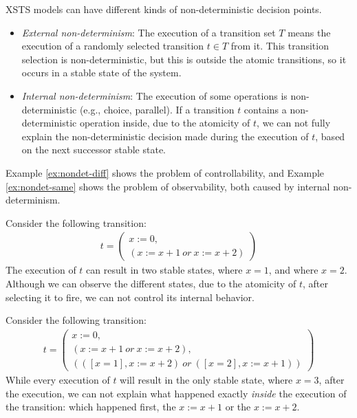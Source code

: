 XSTS models can have different kinds of non-deterministic decision points.

\begin{itemize}
    \item \textit{External non-determinism}: The execution of a transition set $T$ means the execution of a randomly selected transition $t \in T$ from it. This transition selection is non-deterministic, but this is outside the atomic transitions, so it occurs in a stable state of the system.
    \item \textit{Internal non-determinism}: The execution of some operations is non-deterministic (e.g., choice, parallel). If a transition $t$ contains a non-deterministic operation inside, due to the atomicity of $t$, we can not fully explain the non-deterministic decision made during the execution of $t$, based on the next successor stable state.
\end{itemize}

Example \ref{ex:nondet-diff} shows the problem of controllability, and Example \ref{ex:nondet-same} shows the problem of observability, both caused by internal non-determinism.

\begin{example}\label{ex:nondet-diff}
    Consider the following transition:
    \begin{align*}
    t = \begin{pmatrix}
    x := 0, \\
    (x := x + 1\ or\ x := x + 2)
    \end{pmatrix}
    \end{align*}
    The execution of $t$ can result in two stable states, where $x = 1$, and where $x = 2$. Although we can observe the different states, due to the atomicity of $t$, after selecting it to fire, we can not control its internal behavior.
\end{example}

\begin{example}\label{ex:nondet-same}
    Consider the following transition:
    \begin{align*}
    t = \begin{pmatrix}
    x := 0, \\
    (x := x + 1\ or\ x := x + 2), \\
    (([x = 1], x := x + 2)\ or\ ([x = 2], x := x + 1))
    \end{pmatrix}
    \end{align*}
    While every execution of $t$ will result in the only stable state, where $x = 3$, after the execution, we can not explain what happened exactly \emph{inside} the execution of the transition: which happened first, the $x := x+1$ or the $x := x+2$.
\end{example}

